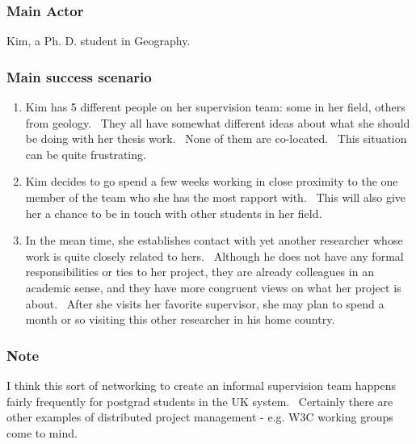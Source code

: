 \subsubsection{Main Actor}

Kim, a Ph. D. student in Geography.

\subsubsection{Main success scenario}

\begin{enumerate}
\item
  Kim has 5 different people on her supervision team: some in her field,
  others from geology. ~They all have somewhat different ideas about
  what she should be doing with her thesis work. ~None of them are
  co-located. ~This situation can be quite frustrating.
\item
  Kim decides to go spend a few weeks working in close proximity to the
  one member of the team who she has the most rapport with. ~This will
  also give her a chance to be in touch with other students in her
  field.
\item
  In the mean time, she establishes contact with yet another researcher
  whose work is quite closely related to hers. ~Although he does not
  have any formal responsibilities or ties to her project, they are
  already colleagues in an academic sense, and they have more congruent
  views on what her project is about. ~After she visits her favorite
  supervisor, she may plan to spend a month or so visiting this other
  researcher in his home country.
\end{enumerate}

\subsubsection{Note}

I think this sort of networking to create an informal supervision team
happens fairly frequently for postgrad students in the UK system.
~Certainly there are other examples of distributed project management -
e.g. W3C working groups come to mind.
